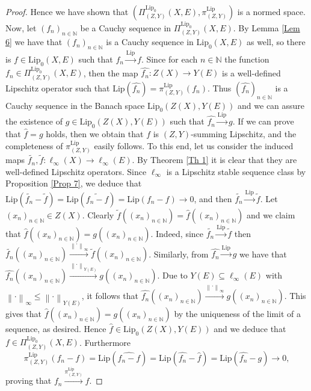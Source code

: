 \documentclass[12pt]{amsart}
\def\N{\mathbb{N}}
\def\Lip{\mathrm{Lip}_0}
\def\Lipnorm{\mathrm{Lip}}
\begin{document}
\begin{proof}
	Hence we have shown that $\left(\Pi_{(Z,Y)}^{\Lip}(X,E),\pi_{(Z,Y)}^{\Lipnorm}\right)$ is a normed space. Now, let $(f_n)_{n\in\N}$ be a Cauchy sequence in $\Pi_{(Z,Y)}^{\Lip}(X,E)$. By Lemma \ref{Lem 6} we have that $(f_n)_{n\in\N}$ is a Cauchy sequence in $\Lip(X,E)$ as well, so there is $f \in \Lip(X,E)$ such that $f_n\xrightarrow{\Lipnorm} f$. Since for each $n\in\N$ the function $f_n \in \Pi_{(Z,Y)}^{\Lip}(X,E)$, then the map $\widehat{f_n}: Z(X) \to Y(E)$ is a well-defined Lipschitz operator such that $\Lipnorm(\widehat{f_n})=\pi_{(Z,Y)}^{\Lipnorm}(f_n)$. Thus $(\widehat{f_n})_{n\in\N}$ is a Cauchy sequence in the Banach space $\Lip(Z(X),Y(E))$ and we can assure the existence of $g \in \Lip(Z(X),Y(E))$ such that $\widehat{f_n} \xrightarrow{\Lipnorm} g$. If we can prove that $\hat{f}=g$ holds, then we obtain that $f$ is $(Z,Y)$-summing Lipschitz, and the completeness of $\pi_{(Z,Y)}^{\Lipnorm}$ easily follows. To this end, let us consider the induced maps $\widetilde{f_n},\tilde{f}:\ell_\infty(X)\to \ell_\infty(E)$. By Theorem \ref{Th 1} it is clear that they are well-defined Lipschitz operators. Since $\ell_\infty$ is a Lipschitz stable sequence class by Proposition \ref{Prop 7}, we deduce that $\Lipnorm(\widetilde{f_n}-\tilde{f})=\Lipnorm(\widetilde{f_n-f})=\Lipnorm(f_n-f) \to 0$, and then $\widetilde{f_n} \xrightarrow{\Lipnorm} \tilde{f}$. Let $(x_n)_{n\in\N} \in Z(X)$. Clearly $\tilde{f}((x_n)_{n\in\N})=\hat{f}((x_n)_{n\in\N})$ and we claim that $\hat{f}((x_n)_{n\in\N})=g((x_n)_{n\in\N})$. Indeed, since $\widetilde{f_n} \xrightarrow{\Lipnorm} \tilde{f}$ then $\widetilde{f_n}((x_n)_{n\in\N}) \xrightarrow{\left\|\cdot\right\|_\infty} \tilde{f}((x_n)_{n\in\N})$. Similarly, from $\widehat{f_n} \xrightarrow{\Lipnorm} g$ we have that $\widehat{f_n}((x_n)_{n\in\N}) \xrightarrow{\left\|\cdot\right\|_{Y(E)}} g((x_n)_{n\in\N})$. Due to $Y(E) \subseteq \ell_\infty(E)$ with $\left\|\cdot\right\|_\infty \leq \left\|\cdot\right\|_{Y(E)}$, it follows that $\widehat{f_n}((x_n)_{n\in\N}) \xrightarrow{\left\|\cdot\right\|_{\infty}} g((x_n)_{n\in\N})$. This gives that $\hat{f}((x_n)_{n\in\N})=g((x_n)_{n\in\N})$ by the uniqueness of the limit of a sequence, as desired. Hence $\hat{f} \in \Lip(Z(X),Y(E))$ and we deduce that $f \in \Pi_{(Z,Y)}^{\Lip}(X,E)$. Furthermore
	$$
	\pi_{(Z,Y)}^{\Lipnorm}(f_n-f) = \Lipnorm(\widehat{f_n-f}) = \Lipnorm(\widehat{f_n}-\hat{f})=\Lipnorm(\widehat{f_n}-g) \to 0,
	$$
	proving that $f_n \xrightarrow{\pi_{(Z,Y)}^{\Lipnorm}} f$.


\end{proof}
\end{document}
